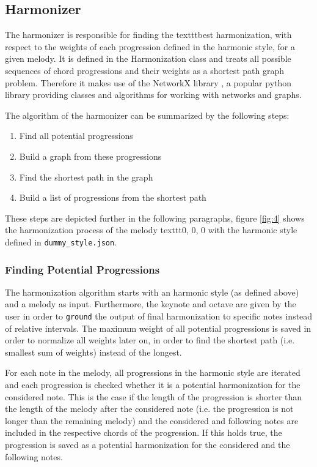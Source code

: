 \subsection{Harmonizer}
The harmonizer is responsible for finding the texttt{best} harmonization, with respect to the weights of each progression defined in the harmonic style, for a given melody. It is defined in the Harmonization class and treats all possible sequences of chord progressions and their weights as a shortest path graph problem. Therefore it makes use of the NetworkX library \cite{networkx}, a popular python library providing classes and algorithms for working with networks and graphs. 

The algorithm of the harmonizer can be summarized by the following steps:
\begin{enumerate}
  \item Find all potential progressions
  \item Build a graph from these progressions
  \item Find the shortest path in the graph
  \item Build a list of progressions from the shortest path
\end{enumerate}
These steps are depicted further in the following paragraphs, figure \ref{fig:4} shows the harmonization process of the melody texttt{0, 0, 0} with the harmonic style defined in \texttt{dummy\_style.json}.

\subsubsection{Finding Potential Progressions}
The harmonization algorithm starts with an harmonic style (as defined above) and a melody as input. Furthermore, the keynote and octave are given by the user in order to \texttt{ground} the output of final harmonization to specific notes instead of relative intervals. The maximum weight of all potential progressions is saved in order to normalize all weights later on, in order to find the shortest path (i.e. smallest sum of weights) instead of the longest.

For each note in the melody, all progressions in the harmonic style are iterated and each progression is checked whether it is a potential harmonization for the considered note. This is the case if the length of the progression is shorter than the length of the melody after the considered note (i.e. the progression is not longer than the remaining melody) and the considered and following notes are included in the respective chords of the progression. If this holds true, the progression is saved as a potential harmonization for the considered and the following notes.

